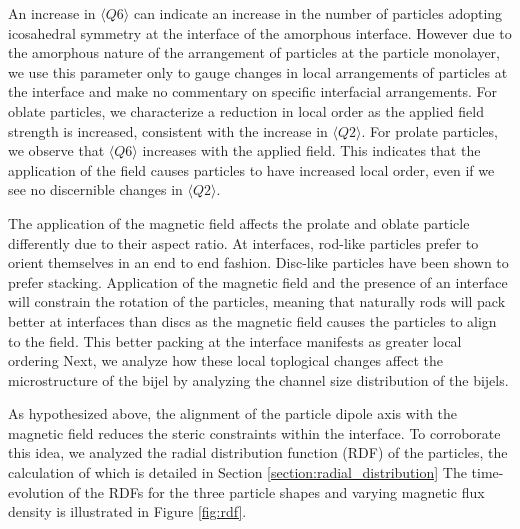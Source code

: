 An increase in $\langle Q6 \rangle$ can indicate an increase in the number of particles adopting icosahedral symmetry at the interface of the amorphous 
interface. \cite{kapfer_jammed_2012} However due to the amorphous nature of the arrangement of particles at the particle monolayer, we use this parameter 
only to gauge changes in local arrangements of particles at the interface and make no commentary on specific interfacial arrangements. For oblate particles, 
we characterize a reduction in local order as the applied field strength is increased, consistent with the increase in $\langle Q2 \rangle$. For prolate 
particles, we observe that $\langle Q6 \rangle$ increases with the applied field. This indicates that the application of the field causes particles to have 
increased local order, even if we see no discernible changes in $\langle Q2 \rangle$. 

The application of the magnetic field affects the prolate and oblate particle differently due to their aspect ratio. At interfaces, rod-like particles 
prefer to orient themselves in an end to end fashion. \cite{eatson_capillary_2023} Disc-like particles have been shown to prefer stacking. \cite{dabat_mesoscale_2018} 
Application of the magnetic field and the presence of an interface will constrain the rotation of the particles, meaning that naturally rods will pack better at 
interfaces than discs as the magnetic field causes the particles to align to the field. This better packing at the interface manifests as greater local ordering 
Next, we analyze how these local toplogical changes affect the microstructure of the bijel by analyzing the channel size distribution of the bijels.

As hypothesized above, the alignment of the particle dipole axis with
the magnetic field reduces the steric constraints within the interface.
To corroborate this idea, we analyzed the radial distribution function
(RDF) of the particles, the calculation of which is detailed in Section
\ref{section:radial_distribution} The time-evolution of the RDFs for the three particle shapes and
varying magnetic flux density is illustrated in Figure \ref{fig:rdf}.


